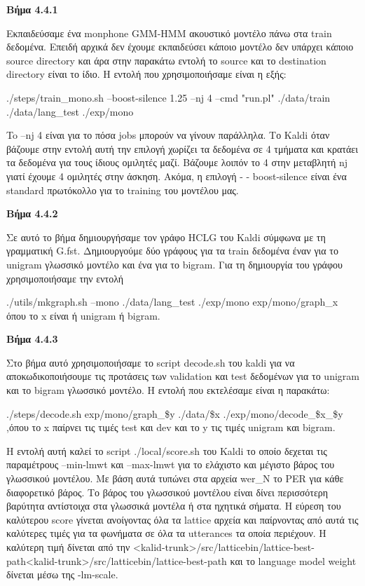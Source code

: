 \documentclass[12pt]{article}
\begin{document}
\textbf{Βήμα 4.4.1}

Εκπαιδεύσαμε ένα monphone GMM-HMM ακουστικό μοντέλο πάνω στα train δεδομένα. Επειδή αρχικά δεν έχουμε εκπαιδεύσει κάποιο μοντέλο δεν υπάρχει κάποιο source directory και άρα στην παρακάτω εντολή το source και το destination directory είναι το ίδιο. Η εντολή που χρησιμοποιήσαμε είναι η εξής: 

./steps/train\_mono.sh --boost-silence 1.25 –nj 4 --cmd "run.pl" ./data/train ./data/lang\_test ./exp/mono

To --nj 4 είναι για το πόσα jobs μπορούν να γίνουν παράλληλα. Το Kaldi όταν βάζουμε στην εντολή αυτή την επιλογή χωρίζει τα δεδομένα σε 4 τμήματα και κρατάει τα δεδομένα για τους ίδιους ομιλητές μαζί. Βάζουμε λοιπόν το 4  στην μεταβλητή nj γιατί έχουμε 4 ομιλητές στην άσκηση.  Ακόμα, η επιλογή - - boost-silence είναι ένα standard πρωτόκολλο για το training του μοντέλου μας.

\textbf{Βήμα 4.4.2}

Σε αυτό το βήμα δημιουργήσαμε τον γράφο HCLG του Kaldi σύμφωνα με τη γραμματική G.fst. 
Δημιουργούμε δύο γράφους για τα train δεδομένα έναν για το unigram γλωσσικό μοντέλο και ένα για το bigram. Για τη δημιουργία του γράφου χρησιμοποιήσαμε την εντολή 

./utils/mkgraph.sh --mono ./data/lang\_test ./exp/mono exp/mono/graph\_x όπου το x είναι ή unigram ή bigram.

\textbf{Βήμα 4.4.3}

Στο βήμα αυτό χρησιμοποιήσαμε το script decode.sh του kaldi για να αποκωδικοποιήσουμε τις προτάσεις των validation και test δεδομένων για το unigram και το bigram γλωσσικό μοντέλο.
Η εντολή που εκτελέσαμε είναι η παρακάτω: 

./steps/decode.sh exp/mono/graph\_\$y ./data/\$x ./exp/mono/decode\_\${x}\_\${y} 
,όπου το x παίρνει τις τιμές test και dev και το y τις τιμές unigram και bigram.

Η εντολή αυτή καλεί το script ./local/score.sh του Kaldi το οποίο δεχεται τις παραμέτρους  --min-lmwt και --max-lmwt για το ελάχιστο και μέγιστο βάρος του γλωσσικού μοντέλου. Με βάση αυτά τυπώνει στα αρχεία wer\_N το PER για κάθε διαφορετικό βάρος.
Το βάρος του γλωσσικού μοντέλου είναι δίνει περισσότερη βαρύτητα  αντίστοιχα στα γλωσσικά μοντέλα ή στα ηχητικά σήματα.
Η εύρεση του καλύτερου score γίνεται ανοίγοντας όλα τα lattice αρχεία και παίρνοντας από αυτά τις καλύτερες τιμές για τα φωνήματα σε όλα τα utterances τα οποία περιέχουν. Η καλύτερη τιμή δίνεται από την 
<kalid-trunk>/src/latticebin/lattice-best-path<kalid-trunk>/src/latticebin/lattice-best-path
και το language model weight δίνεται μέσω της -lm-scale.
\end{document}
